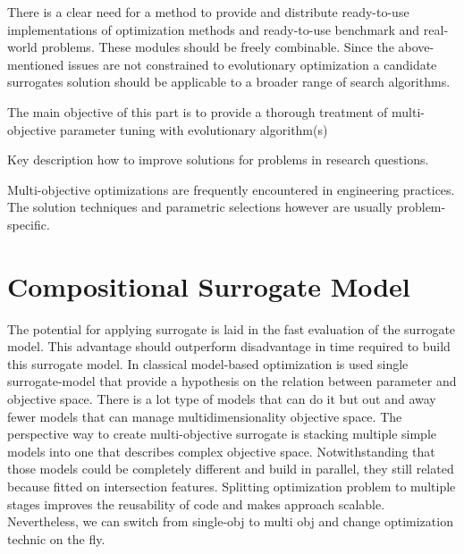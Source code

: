     There is a clear need for a method to provide and distribute ready-to-use implementations of optimization methods and ready-to-use benchmark and real-world problems. 
    These modules should be freely combinable. Since the above- mentioned issues are not constrained to evolutionary optimization a candidate surrogates solution should be applicable to a broader range of search algorithms.

    The main objective of this part is to provide a thorough treatment of multi-objective parameter tuning with evolutionary algorithm(s)

    Key description how to improve solutions for problems in research questions.

    Multi-objective optimizations are frequently encountered in engineering practices. The solution techniques and parametric selections however are usually problem-specific. \cite{abs181207958}

    \section{Compositional Surrogate Model}

        The potential for applying surrogate is laid in the fast evaluation of the surrogate model. This advantage should outperform disadvantage in time required to build this surrogate model. In classical model-based optimization is used single surrogate-model that provide a hypothesis on the relation between parameter and objective space. There is a lot type of models that can do it but out and away fewer models that can manage multidimensionality objective space. The perspective way to create multi-objective surrogate is stacking multiple simple models into one that describes complex objective space. Notwithstanding that those models could be completely different and build in parallel, they still related because fitted on intersection features.
        Splitting optimization problem to multiple stages improves the reusability of code and makes approach scalable. Nevertheless, we can switch from single-obj to multi obj and change optimization technic on the fly.


